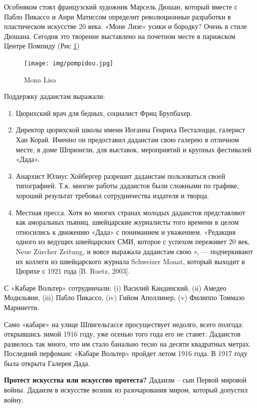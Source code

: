 Особняком стоял французский художник Марсель Дюшан, который вместе с Пабло Пикассо и Анри Матиссом определит революционные разработки в пластическом искусстве 20 века.  «Моне Лизе» усики и бородку? Очень в стиле Дюшана. Сегодня это творение выставлено на почетном месте в парижском Центре Помпиду (Рис \ref{fig:mona-lisa})
\begin{figure}
    \centering
    \texttt{[image: img/pompidou.jpg]}
    \caption{Mona Lisa}\label{fig:mona-lisa}
\end{figure}


Поддержку дадаистам выражали:
\begin{enumerate}
    \item Цюрихский врач для бедных, социалист Фриц Брупбахер.
    \item Директор цюрихской школы имени Иоганна Генриха Песталоцци, галерист Хан Корай. Именно он предоставил дадаистам свою галерею в отличном месте, в доме Шпрюнгли, для выставок, мероприятий и крупных фестивалей «Дада».
    \item Анархист Юлиус Хойбергер разрешит дадаистам пользоваться своей типографией. Т.к. многие работы дадаистов были сложными по графике, хороший результат требовал сотрудничества издателя и творца.
    \item Местная пресса. Хотя во многих странах молодых дадаистов представляют как аморальных пьяниц, швейцарские журналисты того времени в целом относились к движению «Дада» с пониманием и уважением. «Редакция одного из ведущих швейцарских СМИ, которое с успехом переживет 20 век, Neue Zürcher Zeitung, и вовсе выражала дадаистам свою », --- подчеркивают их коллеги из швейцарского журнала Schweizer Monat, который выходит в Цюрихе с 1921 года [B. Ruetz, 2003].
\end{enumerate}

С «Кабаре Вольтер» сотрудничали: (i) Василий Кандинский, (ii) Амедео Модильяни, (iii) Пабло Пикассо, (iv) Гийом Аполлинер, (v) Филиппо Томмазо Маринетти.

Само «кабаре» на улице Шпигельгассе просуществует недолго, всего полгода: открывшись зимой 1916 году, уже осенью того года его не станет. Дадаистов развелось так много, что им стало банально тесно на десяти квадратных метрах. Последний перфоманс «Кабаре Вольтер» пройдет летом 1916 года. В 1917 году была открыта Галерея Дада.

\textbf{Протест искусства или искусство протеста?}
Дадаизм – сын Первой мировой войны. Дадаизм в искусстве возник из разочарования миром, который допустил войну.

